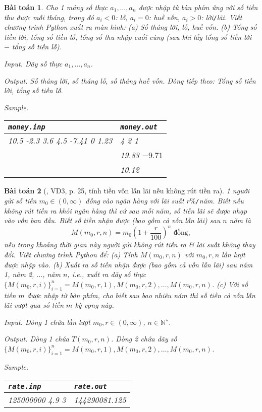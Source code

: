 \documentclass{article}
\newtheorem{baitoan}{Bài toán}
\begin{document}
\begin{baitoan}
	Cho 1 mảng số thực $a_1,\ldots,a_n$ được nhập từ bàn phím ứng với số tiền thu được mỗi tháng, trong đó $a_i < 0$: lỗ, $a_i = 0$: huề vốn, $a_i > 0$: lời{\tt/}lãi. Viết chương trình Python xuất ra màn hình: (a) Số tháng lời, lỗ, huề vốn. (b) Tổng số tiền lời, tổng số tiền lỗ, tổng số thu nhập cuối cùng (sau khi lấy tổng số tiền lời $-$ tổng số tiền lỗ).
	\item {\sf Input.} Dãy số thực $a_1,\ldots,a_n$.
	\item {\sf Output.} Số tháng lời, số tháng lỗ, số tháng huề vốn. Dòng tiếp theo: Tổng số tiền lời, tổng số tiền lỗ.
	\item {\sf Sample.}
	\begin{table}[H]
		\centering
		\begin{tabular}{|l|l|}
			\hline
			{\tt money.inp} & {\tt money.out} \\
			\hline
			10.5 -2.3 3.6 4.5 -7.41 0 1.23 & 4 2 1 \\
			& 19.83 $-9.71$ \\
			& 10.12 \\
			\hline
		\end{tabular}
	\end{table}
\end{baitoan}

\begin{baitoan}[\cite{CDHT_Toan_10_CD}, VD3, p. 25, tính tiền vốn lẫn lãi nếu không rút tiền ra]
	1 người gửi số tiền $m_0\in(0,\infty)$ đồng vào ngân hàng với lãi suất $r\%${\tt/}năm. Biết nếu không rút tiền ra khỏi ngân hàng thì cứ sau mỗi năm, số tiền lãi sẽ được nhạp vào vốn ban đầu. Biết số tiền nhận được (bao gồm cả vốn lẫn lãi) sau $n$ năm là
	\begin{equation*}
		M(m_0,r,n) = m_0\left(1 + \frac{r}{100}\right)^n\mbox{ đồng},
	\end{equation*}
	nếu trong khoảng thời gian này người gửi không rút tiền ra \& lãi suất không thay đổi. Viết chương trình Python để: (a) Tính $M(m_0,r,n)$ với $m_0,r,n$ lần lượt được nhập vào. (b) Xuất ra số tiền nhận được (bao gồm cả vốn lẫn lãi) sau năm 1, năm 2, $\ldots$, năm $n$, i.e., xuất ra dãy số thực $\{M(m_0,r,i)\}_{i=1}^n = M(m_0,r,1),M(m_0,r,2),\ldots,M(m_0,r,n)$. (c) Với số tiền $m$ được nhập từ bàn phím, cho biết sau bao nhiêu năm thì số tiền cả vốn lẫn lãi vượt qua số tiền $m$ kỳ vọng này.
	\item {\sf Input.} Dòng 1 chứa lần lượt $m_0,r\in(0,\infty)$, $n\in\mathbb{N}^\star$.
	\item {\sf Output.} Dòng 1 chứa $T(m_0,r,n)$. Dòng 2 chứa dãy số $\{M(m_0,r,i)\}_{i=1}^n = M(m_0,r,1),M(m_0,r,2),\ldots,M(m_0,r,n)$.
	\item {\sf Sample.}
	\begin{table}[H]
		\centering
		\begin{tabular}{|l|l|}
			\hline
			{\tt rate.inp} & {\tt rate.out} \\
			\hline
			125000000 4.9 3 & 144290081.125 \\
			\hline
		\end{tabular}
	\end{table}
\end{baitoan}
\end{document}
